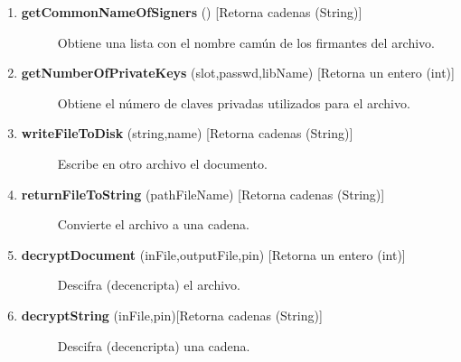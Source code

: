 \documentclass[letterpaper,11pt,spanish]{sphinxmanual}
\begin{document}
\begin{description}
\begin{enumerate}
\begin{description}
\end{description}

\item {} \begin{description}
\item[{\textbf{getCommonNameOfSigners} () {[}Retorna cadenas (String){]}}] \leavevmode
Obtiene una lista con el nombre camún de los firmantes del archivo.

\end{description}

\item {} \begin{description}
\item[{\textbf{getNumberOfPrivateKeys} (slot,passwd,libName) {[}Retorna un entero (int){]}}] \leavevmode
Obtiene el número de claves privadas utilizados para el archivo.

\end{description}

\item {} \begin{description}
\item[{\textbf{writeFileToDisk} (string,name) {[}Retorna cadenas (String){]}}] \leavevmode
Escribe en otro archivo el documento.

\end{description}

\item {} \begin{description}
\item[{\textbf{returnFileToString} (pathFileName) {[}Retorna cadenas (String){]}}] \leavevmode
Convierte el archivo a una cadena.

\end{description}

\item {} \begin{description}
\item[{\textbf{decryptDocument} (inFile,outputFile,pin) {[}Retorna un entero (int){]}}] \leavevmode
Descifra (decencripta) el archivo.

\end{description}

\item {} \begin{description}
\item[{\textbf{decryptString} (inFile,pin){[}Retorna cadenas (String){]}}] \leavevmode
Descifra (decencripta) una cadena.

\end{description}


\end{enumerate}
\end{description}
\end{document}
